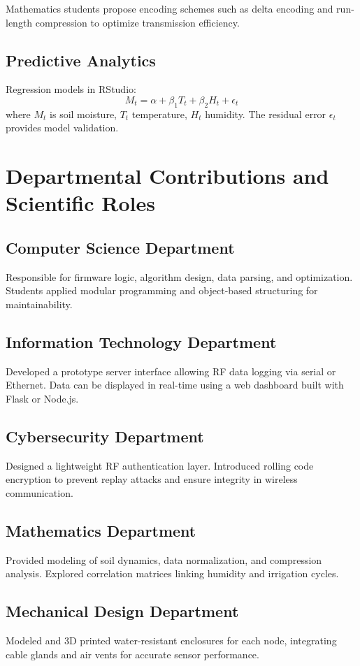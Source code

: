 \documentclass[12pt,a4paper]{article}
\begin{document}
Mathematics students propose encoding schemes such as delta encoding and run-length compression to optimize transmission efficiency.

\subsection{Predictive Analytics}
Regression models in RStudio:
\[
M_t = \alpha + \beta_1 T_t + \beta_2 H_t + \epsilon_t
\]
where \(M_t\) is soil moisture, \(T_t\) temperature, \(H_t\) humidity. The residual error \( \epsilon_t \) provides model validation.

\clearpage
\section{Departmental Contributions and Scientific Roles}

\subsection{Computer Science Department}
Responsible for firmware logic, algorithm design, data parsing, and optimization. Students applied modular programming and object-based structuring for maintainability.

\subsection{Information Technology Department}
Developed a prototype server interface allowing RF data logging via serial or Ethernet. Data can be displayed in real-time using a web dashboard built with Flask or Node.js.

\subsection{Cybersecurity Department}
Designed a lightweight RF authentication layer. Introduced rolling code encryption to prevent replay attacks and ensure integrity in wireless communication.

\subsection{Mathematics Department}
Provided modeling of soil dynamics, data normalization, and compression analysis. Explored correlation matrices linking humidity and irrigation cycles.

\subsection{Mechanical Design Department}
Modeled and 3D printed water-resistant enclosures for each node, integrating cable glands and air vents for accurate sensor performance.
\end{document}

